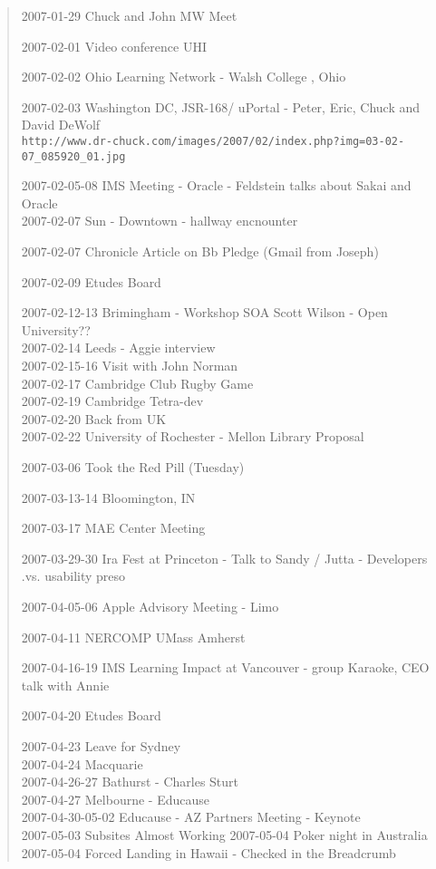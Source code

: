 \begin{quote}
2007-01-29 Chuck and John MW Meet

2007-02-01 Video conference UHI

2007-02-02 Ohio Learning Network - Walsh College , Ohio

2007-02-03 Washington DC, JSR-168/ uPortal - Peter, Eric, Chuck and David DeWolf\\
\verb"http://www.dr-chuck.com/images/2007/02/index.php?img=03-02-07_085920_01.jpg"

2007-02-05-08 IMS Meeting - Oracle - Feldstein talks about Sakai and Oracle\\
2007-02-07 Sun - Downtown - hallway encnounter

2007-02-07 Chronicle Article on Bb Pledge (Gmail from Joseph)

2007-02-09 Etudes Board

2007-02-12-13 Brimingham - Workshop SOA Scott Wilson - Open University??\\
2007-02-14 Leeds - Aggie interview \\
2007-02-15-16 Visit with John Norman\\
2007-02-17 Cambridge Club Rugby Game\\
2007-02-19 Cambridge Tetra-dev\\
2007-02-20 Back from UK\\

2007-02-22 University of Rochester - Mellon Library Proposal

2007-03-06 Took the Red Pill (Tuesday)

2007-03-13-14 Bloomington, IN

2007-03-17 MAE Center Meeting

2007-03-29-30 Ira Fest at Princeton - Talk to 
Sandy / Jutta - Developers .vs. usability preso

2007-04-05-06 Apple Advisory Meeting - Limo

2007-04-11 NERCOMP UMass Amherst

2007-04-16-19 IMS Learning Impact at Vancouver - group Karaoke, CEO talk with Annie

2007-04-20 Etudes Board

2007-04-23 Leave for Sydney\\
2007-04-24 Macquarie\\
2007-04-26-27 Bathurst - Charles Sturt\\
2007-04-27 Melbourne - Educause\\
2007-04-30-05-02 Educause - AZ Partners Meeting - Keynote\\
2007-05-03 Subsites Almost Working
2007-05-04 Poker night in Australia\\
2007-05-04 Forced Landing in Hawaii - Checked in the Breadcrumb\\


\end{quote}
